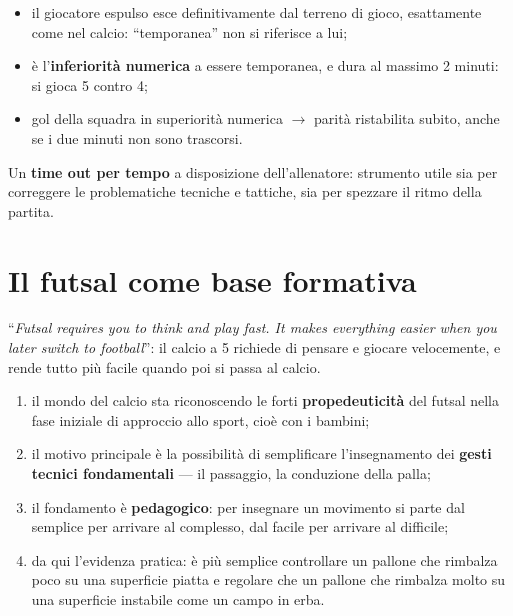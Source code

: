 \begin{itemize}
  \item il giocatore espulso esce definitivamente dal terreno di gioco, esattamente come nel calcio:
    ``temporanea'' non si riferisce a lui;
  \item è l'\textbf{inferiorità numerica} a essere temporanea, e dura al massimo 2 minuti: si gioca
    5 contro 4;
  \item gol della squadra in superiorità numerica $\rightarrow$ parità ristabilita subito, anche se
    i due minuti non sono trascorsi.
\end{itemize}

Un \textbf{time out per tempo} a disposizione dell'allenatore: strumento utile sia per correggere le
problematiche tecniche e tattiche, sia per spezzare il ritmo della partita.

\section{Il futsal come base formativa}

``\textit{Futsal requires you to think and play fast. It makes everything easier when you later
switch to football}'': il calcio a 5 richiede di pensare e giocare velocemente, e rende tutto più
facile quando poi si passa al calcio.

\begin{enumerate}
  \item il mondo del calcio sta riconoscendo le forti \textbf{propedeuticità} del futsal nella fase
    iniziale di approccio allo sport, cioè con i bambini;
  \item il motivo principale è la possibilità di semplificare l'insegnamento dei \textbf{gesti
    tecnici fondamentali} --- il passaggio, la conduzione della palla;
  \item il fondamento è \textbf{pedagogico}: per insegnare un movimento si parte dal semplice per
    arrivare al complesso, dal facile per arrivare al difficile;
  \item da qui l'evidenza pratica: è più semplice controllare un pallone che rimbalza poco su una
    superficie piatta e regolare che un pallone che rimbalza molto su una superficie instabile come
    un campo in erba.
\end{enumerate}

